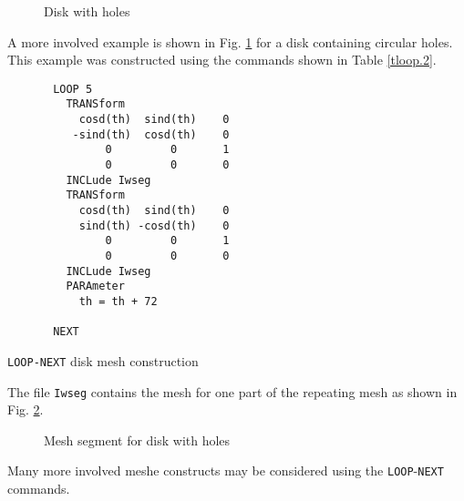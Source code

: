 \begin{figure}[ht!]
\epsfysize=3.5in
\centerline {\hfil {} \hfil}
\caption{Disk with holes}
\label{floop.1}
\end{figure}
A more involved example is shown 
in Fig. \ref{floop.1} for a disk containing circular holes.  This
example was constructed using the commands shown in Table \ref{tloop.2}.
\begin{table}[ht!]
\begin{center}
\begin{verbatim}
       LOOP 5
         TRANSform
           cosd(th)  sind(th)    0
          -sind(th)  cosd(th)    0
               0         0       1
               0         0       0
         INCLude Iwseg
         TRANSform
           cosd(th)  sind(th)    0
           sind(th) -cosd(th)    0
               0         0       1
               0         0       0
         INCLude Iwseg
         PARAmeter
           th = th + 72

       NEXT
\end{verbatim}
\caption{\texttt{LOOP-NEXT} disk mesh construction}
\label{tloop.2}
\end{center}
\end{table}
The file \texttt{Iwseg} contains the mesh for one part of the repeating
mesh as shown in Fig. \ref{floop.2}.
\begin{figure}[ht!]
\epsfysize=2.0in
\centerline {\hfil {} \hfil}
\caption{Mesh segment for disk with holes}
\label{floop.2}
\end{figure}

Many more involved meshe constructs may be considered using the
\texttt{LOOP}-\texttt{NEXT} commands.
